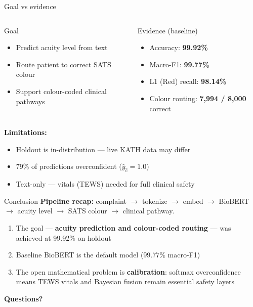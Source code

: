 \begin{frame}{Goal vs evidence}
  \small
  \begin{columns}[T]
    \begin{block}{Goal}
      \begin{itemize}
        \item Predict acuity level from text
        \item Route patient to correct SATS colour
        \item Support colour-coded clinical pathways
      \end{itemize}
    \end{block}

    \begin{block}{Evidence (baseline)}
      \begin{itemize}
        \item Accuracy: \textbf{99.92\%}
        \item Macro-F1: \textbf{99.77\%}
        \item L1 (Red) recall: \textbf{98.14\%}
        \item Colour routing: \textbf{7,994 / 8,000} correct
      \end{itemize}
    \end{block}
  \end{columns}

  \vspace{0.15cm}
  \textbf{Limitations:}
  \begin{itemize}
    \item Holdout is in-distribution --- live KATH data may differ
    \item 79\% of predictions overconfident ($\hat{y}_{\hat{c}} = 1.0$)
    \item Text-only --- vitals (TEWS) needed for full clinical safety
  \end{itemize}
\end{frame}

\begin{frame}{Conclusion}
  \small
  \textbf{Pipeline recap:}
  complaint $\to$ tokenize $\to$ embed $\to$ BioBERT $\to$ acuity level $\to$ SATS colour $\to$ clinical pathway.

  \vspace{0.15cm}
  \begin{enumerate}
    \item The goal --- \textbf{acuity prediction and colour-coded routing} --- was achieved at 99.92\% on holdout
    \item Baseline BioBERT is the default model (99.77\% macro-F1)
    \item The open mathematical problem is \textbf{calibration}: softmax overconfidence means TEWS vitals and Bayesian fusion remain essential safety layers
  \end{enumerate}

  \vspace{0.3cm}
  \centering
  \Large\textbf{Questions?}
\end{frame}
